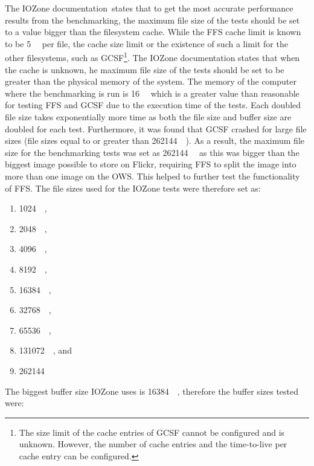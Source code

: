 The IOZone documentation\,\cite{iozoneIozoneFilesystemBenchmark} states that to get the most accurate performance results from the benchmarking, the maximum file size of the tests should be set to a value bigger than the filesystem cache. While the \gls{FFS} cache limit is known to be \SI{5}{\mega\byte} per file, the cache size limit or the existence of such a limit for the other filesystems, such as \gls{GCSF}\footnote{The size limit of the cache entries of \gls{GCSF} cannot be configured and is unknown. However, the number of cache entries and the \mbox{time-to-live} per cache entry can be configured.}. The IOZone documentation states that when the cache is unknown, he maximum file size of the tests should be set to be greater than the physical memory of the system. The memory of the computer where the benchmarking is run is \SI{16}{\giga\byte} which is a greater value than reasonable for testing \gls{FFS} and \gls{GCSF} due to the execution time of the tests. Each doubled file size takes exponentially more time as both the file size and buffer size are doubled for each test. Furthermore, it was found that \gls{GCSF} crashed for large file sizes (\ie file sizes equal to or greater than \SI[per-mode = symbol]{262144}{\kilo\byte}). As a result, the maximum file size for the benchmarking tests was set as \SI{262144}{\kilo\byte} as this was bigger than the biggest image possible to store on Flickr, requiring \gls{FFS} to split the image into more than one image on the \gls{OWS}. This helped to further test the functionality of FFS. The file sizes used for the IOZone tests were therefore set as:
\begin{enumerate}
	\item \SI{1024}{\kilo\byte},
	\item \SI{2048}{\kilo\byte},
	\item \SI{4096}{\kilo\byte},
	\item \SI{8192}{\kilo\byte},
	\item \SI{16384}{\kilo\byte},
	\item \SI{32768}{\kilo\byte},
	\item \SI{65536}{\kilo\byte},
	\item \SI{131072}{\kilo\byte}, and
	\item \SI{262144}{\kilo\byte}
\end{enumerate}
The biggest buffer size IOZone uses is \SI{16384}{\kilo\byte}, therefore the buffer sizes tested were:
